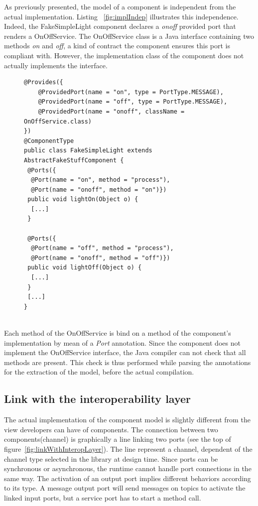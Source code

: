 As previously presented, the model of a component is independent from the actual implementation. Listing ~\ref{fig:implIndep} illustrates this independence. Indeed, the FakeSimpleLight component declares a {\it onoff} provided port that renders a OnOffService. The OnOffService class is a Java interface containing two methods {\it on} and {\it off}, a kind of contract the component ensures this port is compliant with. However, the implementation class of the component does not actually implements the interface.\\
\begin{figure}[h!]
\centering
\begin{lstlisting}[caption=Implementation independence,label=fig:implIndep,basicstyle=\scriptsize\ttfamily,tabsize=2 ]
@Provides({
    @ProvidedPort(name = "on", type = PortType.MESSAGE),
    @ProvidedPort(name = "off", type = PortType.MESSAGE),
    @ProvidedPort(name = "onoff", className = OnOffService.class)
})
@ComponentType
public class FakeSimpleLight extends AbstractFakeStuffComponent {
 @Ports({
  @Port(name = "on", method = "process"),
  @Port(name = "onoff", method = "on")})
 public void lightOn(Object o) {
  [...]
 }

 @Ports({
  @Port(name = "off", method = "process"),
  @Port(name = "onoff", method = "off")})
 public void lightOff(Object o) {
  [...]
 }
 [...]
}
\end{lstlisting} 
\end{figure}\\
Each method of the OnOffService is bind on a method of the component's implementation by mean of a {\it Port} annotation. Since the component does not implement the OnOffService interface, the Java compiler can not check that all methods are present. This check is thus performed while parsing the annotations for the extraction of the model, before the actual compilation.



\subsection{Link with the interoperability layer}
\label{subsec:compModLinkWithInterop}
The actual implementation of the component model is slightly different from the view developers can have of components. The connection between two components(channel) is graphically a line linking two ports (see the top of figure~\ref{fig:linkWithInteropLayer}). The line represent a channel, dependent of the channel type selected in the library at design time. Since ports can be synchronous or asynchronous, the runtime cannot handle port connections in the same way. The activation of an output port implies different behaviors according to its type. A message output port will send messages on topics to activate the linked input ports, but a service port has to start a method call.\\

